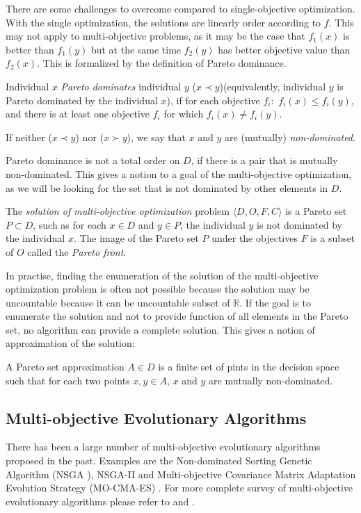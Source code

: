 There are some challenges to overcome compared to single-objective optimization. With the single optimization, the solutions are linearly order according to $f$. This may not apply to multi-objective problems, as it may be the case that $f_1(x)$ is better than $f_1(y)$ but at the same time $f_2(y)$ has better objective value than $f_2(x)$.
This is formalized by the definition of Pareto dominance.
\begin{definition}
	Individual $x$ \emph{Pareto dominates} individual $y$ ($x \prec y$)(equivalently, individual $y$ is Pareto dominated by the individual $x$), if for each objective $f_i:$ $f_i(x) \le f_i(y)$, and there is at least one objective $f_i$ for which $f_i(x) \ne f_i(y)$.
	
	If neither ($x \prec y$) nor ($x \succ y$), we say that $x$ and $y$ are (mutually) \emph{non-dominated}. 
\end{definition}
Pareto dominance is not a total order on $D$, if there is a pair that is mutually non-dominated. This gives a notion to a goal of the multi-objective optimization, as we will be looking for the set that is not dominated by other elements in $D$.
\begin{definition}
	The \emph{solution of multi-objective optimization} problem $\langle D, O, F, C \rangle$ is a Pareto set $P \subset D$, such as for each $x \in D$ and $y \in P$, the individual $y$ is not dominated by the individual $x$. The image of the Pareto set $P$ under the objectives $F$ is a subset of $O$ called the \emph{Pareto front}.
\end{definition}
In practise, finding the enumeration of the solution of the multi-objective optimization problem is often not possible because the solution may be uncountable because it can be uncountable subset of $\mathbb{R}$. If the goal is to enumerate the solution and not to provide function of all elements in the Pareto set, no algorithm can provide a complete solution. This gives a notion of approximation of the solution:
\begin{definition}
	A Pareto set approximation $A \in D$ is a finite set of pints in the decision space such that for each two points $x,y \in A$, $x$ and $y$ are mutually non-dominated.
\end{definition}

\subsection{Multi-objective Evolutionary Algorithms}
There has been a large number of multi-objective evolutionary algorithms proposed in the
past. Examples are the Non-dominated Sorting Genetic Algorithm (NSGA \cite{nsga}), NSGA-II \cite{nsgaII} and Multi-objective Covariance Matrix Adaptation Evolution Strategy (MO-CMA-ES) \cite{IgelCovarianceMatrixAdaptation}. For more complete survey of multi-objective evolutionary algorithms please refer to \cite{BingdongManyObjectiveEvolutionaryAlgorithmsSurvey} and \cite{ZhouMultiobjectiveEASurvey}.

